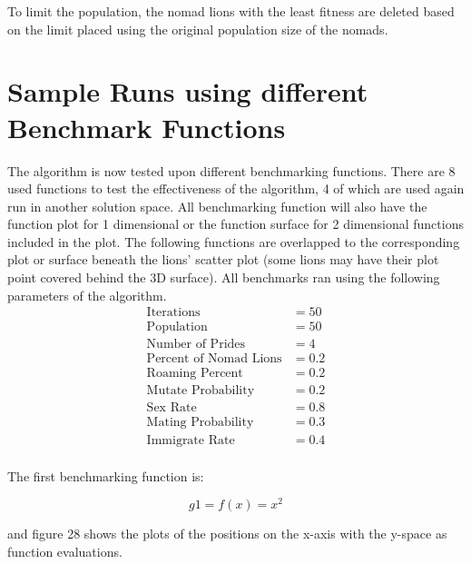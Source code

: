 \par To limit the population, the nomad lions with the least fitness are deleted based on the limit placed using the original population size of the nomads.

\section{Sample Runs using different Benchmark Functions}
\par The algorithm is now tested upon different benchmarking functions. There are 8 used functions to test the effectiveness of the algorithm, 4 of which are used again run in another solution space. All benchmarking function will also have the function plot for 1 dimensional or the function surface for 2 dimensional functions included in the plot. The following functions are overlapped to the corresponding plot or surface beneath the lions' scatter plot (some lions may have their plot point covered behind the 3D surface). All benchmarks ran using the following parameters of the algorithm.
\begin{align*}
\text{Iterations} &= 50\\
\text{Population} &= 50\\
\text{Number of Prides} &= 4\\
\text{Percent of Nomad Lions} &= 0.2\\
\text{Roaming Percent} &= 0.2\\
\text{Mutate Probability} &= 0.2\\
\text{Sex Rate} &= 0.8\\
\text{Mating Probability} &= 0.3\\
\text{Immigrate Rate} &= 0.4\\
\end{align*}
\par The first benchmarking function is:

$$
  g1=f(x) = x^2
$$

and figure 28 shows the plots of the positions on the x-axis with the y-space as function evaluations.

